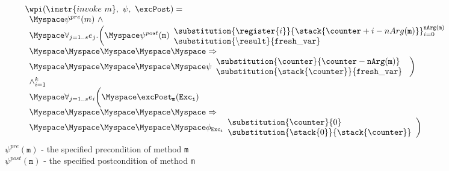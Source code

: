 \begin{figure}[!ht]
$$
\begin{array}{l}
\wpi(\instr{invoke \  m}, \ \psi ,\ \excPost) =\\ 
\begin{array}{l}
\Myspace \psi^{pre}(m) \ \wedge \\
\Myspace  \forall_{j = 1..s} e_{j}.\biggl( 
\Myspace \psi^{post}( \texttt{m}) 
                     \begin{array}{l}
                     \substitution{\register{i}}{\stack{\counter+i-nArg(\texttt{m}) }}_{i=0}^{\tt{nArg(m)}}  \\
                      \substitution{\tt{\backslash result} }{ fresh\_var } \\
                     \end{array} \\
  \Myspace\Myspace\Myspace\Myspace\Myspace                    \Rightarrow  \\
\Myspace\Myspace\Myspace\Myspace\Myspace   \psi  \begin{array}{l}
                             \substitution{\counter }{\counter - \tt{nArg}( \texttt{m} )} \\
                             \substitution{\stack{\counter } }{ \tt{fresh\_var}}  \   
                         \end{array}\biggr) \\
\wedge_{i = 1}^k\\
\Myspace \forall_{j = 1..s} e_i \biggl( 
\Myspace \excPost_{\tt{m} } ( \tt{Exc_i} ) \\
\Myspace\Myspace\Myspace\Myspace\Myspace \Rightarrow \\
\Myspace\Myspace\Myspace\Myspace\Myspace   \phi_{\tt{Exc_i} }
                                 \begin{array}{l}
                                       \substitution{ \counter}{  0} \\
                                        \substitution{\stack{0}}{ \stack{\counter}}   
              		\end{array}   \biggr)   \\
\end{array} \\[15 mm]
\end{array}
$$
$\psi^{pre}(\texttt{m})$ -  the specified  precondition of  method \texttt{m} \\
$\psi^{post}(\texttt{m})$ - the   specified   postcondition   of   method  \texttt{m}  \\

\end{figure}
